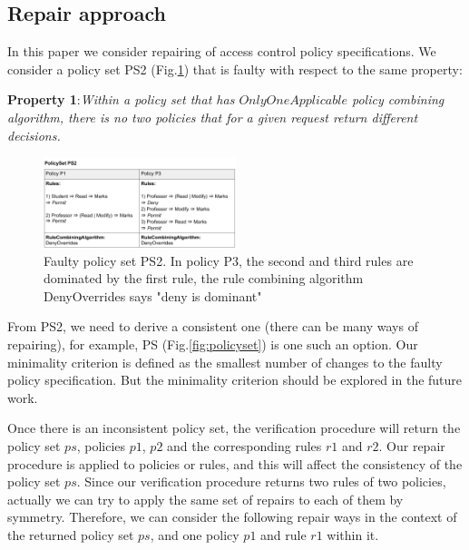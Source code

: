 \documentclass[letterpaper]{acm_proc_article-sp}
\begin{document}
\subsection{Repair approach}

In this paper we consider repairing of access control policy specifications. We consider a policy set PS2 (Fig.\ref{fig:policysetfaulty}) that is faulty with respect to the same property:

\textbf{Property 1}:\textit{Within a policy set that has $OnlyOneApplicable$ policy combining algorithm, there is no two policies that for a given request return different decisions.}

\begin{figure}[h]
\includegraphics[width=0.5\textwidth]{policyset_faulty.png}
\caption{Faulty policy set PS2. In policy P3, the second and third rules are dominated by the first rule, the rule combining algorithm DenyOverrides says "deny is dominant"}    
  \label{fig:policysetfaulty}
\end{figure}

From PS2, we need to derive a consistent one (there can be many ways of repairing), for example, PS (Fig.\ref{fig:policyset}) is one such an option. Our minimality criterion is defined as the smallest number of changes to the faulty policy specification. But the minimality criterion should be explored in the future work.

Once there is an inconsistent policy set, the verification procedure will return the policy set $ps$, policies $p1$, $p2$ and the corresponding rules $r1$ and $r2$. Our repair procedure is applied to policies or rules, and this will affect the consistency of the policy set $ps$. Since our verification procedure returns two rules of two policies, actually we can try to apply the same set of repairs to each of them by symmetry. Therefore, we can consider the following repair ways in the context of the returned policy set $ps$, and one policy $p1$ and rule $r1$ within it.
\end{document}
